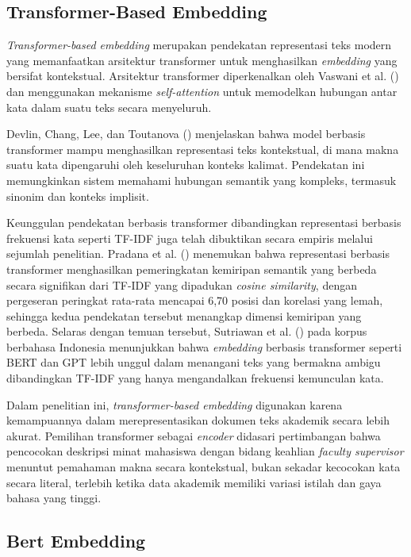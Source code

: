 \subsection{Transformer-Based Embedding}\label{transformer-based-embedding}

\textit{Transformer-based embedding} merupakan pendekatan representasi teks modern yang memanfaatkan arsitektur transformer untuk menghasilkan \textit{embedding} yang bersifat kontekstual. Arsitektur transformer diperkenalkan oleh Vaswani et al. (\citeyear{vaswani2017attention}) dan menggunakan mekanisme \textit{self-attention} untuk memodelkan hubungan antar kata dalam suatu teks secara menyeluruh.

Devlin, Chang, Lee, dan Toutanova (\citeyear{devlin2019bert}) menjelaskan bahwa model berbasis transformer mampu menghasilkan representasi teks kontekstual, di mana makna suatu kata dipengaruhi oleh keseluruhan konteks kalimat. Pendekatan ini memungkinkan sistem memahami hubungan semantik yang kompleks, termasuk sinonim dan konteks implisit.

Keunggulan pendekatan berbasis transformer dibandingkan representasi berbasis frekuensi kata seperti TF-IDF juga telah dibuktikan secara empiris melalui sejumlah penelitian. Pradana et al. (\citeyear{pradana2026behavioral}) menemukan bahwa representasi berbasis transformer menghasilkan pemeringkatan kemiripan semantik yang berbeda secara signifikan dari TF-IDF yang dipadukan \textit{cosine similarity}, dengan pergeseran peringkat rata-rata mencapai 6,70 posisi dan korelasi yang lemah, sehingga kedua pendekatan tersebut menangkap dimensi kemiripan yang berbeda. Selaras dengan temuan tersebut, Sutriawan et al. (\citeyear{sutriawan2025performance}) pada korpus berbahasa Indonesia menunjukkan bahwa \textit{embedding} berbasis transformer seperti BERT dan GPT lebih unggul dalam menangani teks yang bermakna ambigu dibandingkan TF-IDF yang hanya mengandalkan frekuensi kemunculan kata.

Dalam penelitian ini, \textit{transformer-based embedding} digunakan karena kemampuannya dalam merepresentasikan dokumen teks akademik secara lebih akurat. Pemilihan transformer sebagai \textit{encoder} didasari pertimbangan bahwa pencocokan deskripsi minat mahasiswa dengan bidang keahlian \textit{faculty supervisor} menuntut pemahaman makna secara kontekstual, bukan sekadar kecocokan kata secara literal, terlebih ketika data akademik memiliki variasi istilah dan gaya bahasa yang tinggi.

\subsection{Bert Embedding}\label{bert-embedding}

